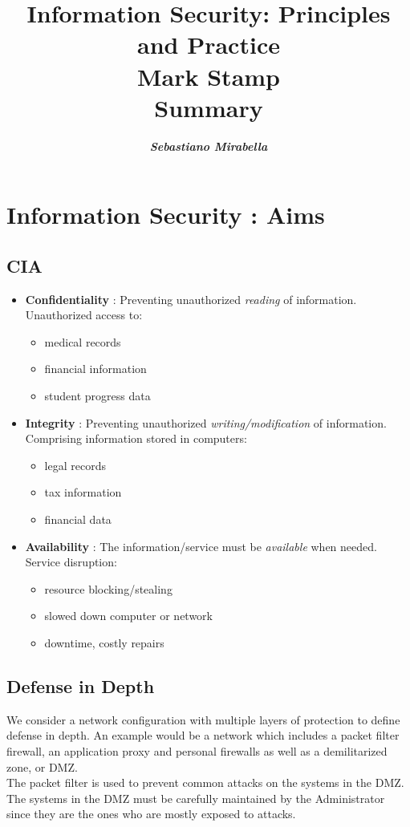 \documentclass{article}
\title{\textbf{Information Security: Principles and Practice\\ Mark Stamp}\\ Summary}
\author{\textbf{\textit{Sebastiano Mirabella}}}
\begin{document}
\date{}
\maketitle
\tableofcontents
\newpage
{}

\section{Information Security : Aims}
\subsection{CIA}
\begin{itemize}
    \item \textbf{Confidentiality} : Preventing unauthorized \textit{reading} of information.\\
            Unauthorized access to:
            \begin{itemize}
                \item medical records
                \item financial information
                \item student progress data
            \end{itemize}
    \item \textbf{Integrity} : Preventing unauthorized \textit{writing/modification} of information.\\
            Comprising information stored in computers:
            \begin{itemize}
                \item legal records
                \item tax information
                \item financial data
            \end{itemize}
    \item \textbf{Availability} : The information/service must be \textit{available} when needed.\\
    Service disruption:
    \begin{itemize}
        \item resource blocking/stealing
        \item slowed down computer or network
        \item downtime, costly repairs
    \end{itemize}
\end{itemize}
\subsection{Defense in Depth}
We consider a network configuration with multiple layers of protection to define defense in depth. An example would be a network which includes a packet filter firewall, an application proxy and personal firewalls as well as a demilitarized zone, or DMZ.\\
The packet filter is used to prevent common attacks on the systems in the DMZ. The systems in the DMZ must be carefully maintained by the Administrator since they are the ones who are mostly exposed to attacks.
\end{document}
